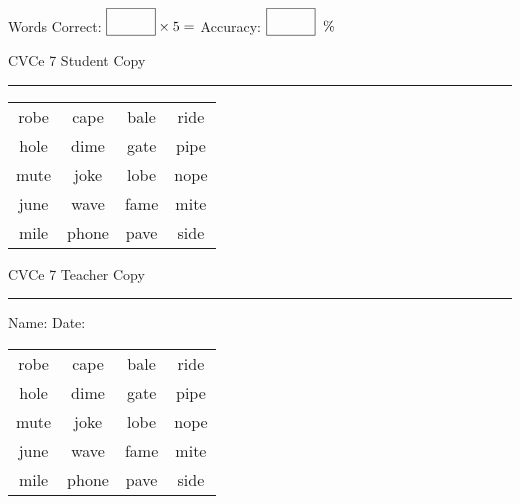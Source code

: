 \documentclass{memoir}
\begin{document}
\small

Words Correct: $\fbox{\phantom{\huge 100}} \times 5 = $ Accuracy: $\fbox{\phantom{\huge 100}}\;\; \%$ 

\vfill

\newpage


\footnotesize \noindent
CVCe 7 \hfill Student Copy
\smallskip
\hrule

\Large

\setlength{\tabcolsep}{14pt}
\def\arraystretch{2}

{\selectfont


\begin{vplace}[0.5]
\begin{center}
\begin{tabular}{cccc}
robe & cape & bale & ride \\
hole & dime & gate & pipe \\
mute & joke & lobe & nope \\
june & wave & fame & mite \\
mile & phone & pave & side \\
\end{tabular}
\end{center}
\end{vplace}

}

\newpage

\footnotesize \noindent
CVCe 7 \hfill Teacher Copy
\smallskip
\hrule

\small

\vfill

\noindent
Name: \underline{\hspace{1.75in}} \hfill Date: \underline{\hspace{1in}}

\Large

{\selectfont


\begin{vplace}[0.5]
\begin{center}
\begin{tabular}{cccc}
robe & cape & bale & ride \\
hole & dime & gate & pipe \\
mute & joke & lobe & nope \\
june & wave & fame & mite \\
mile & phone & pave & side \\
\end{tabular}
\end{center}
\end{vplace}



}
\end{document}
